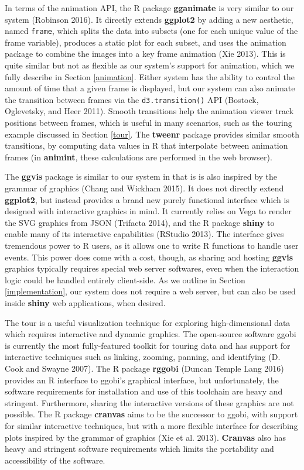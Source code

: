 \documentclass[12pt,]{article}
\theoremstyle{definition}
\theoremstyle{definition}
\theoremstyle{definition}
\theoremstyle{remark}
\begin{document}
In terms of the animation API, the R package \textbf{gganimate} is very
similar to our system (Robinson 2016). It directly extends
\textbf{ggplot2} by adding a new aesthetic, named \texttt{frame}, which
splits the data into subsets (one for each unique value of the frame
variable), produces a static plot for each subset, and uses the
animation package to combine the images into a key frame animation (Xie
2013). This is quite similar but not as flexible as our system's support
for animation, which we fully describe in Section \ref{animation}.
Either system has the ability to control the amount of time that a given
frame is displayed, but our system can also animate the transition
between frames via the \texttt{d3.transition()} API (Bostock,
Oglevetsky, and Heer 2011). Smooth transitions help the animation viewer
track positions between frames, which is useful in many scenarios, such
as the touring example discussed in Section \ref{tour}. The
\textbf{tweenr} package provides similar smooth transitions, by
computing data values in R that interpolate between animation frames (in
\textbf{animint}, these calculations are performed in the web browser).

The \textbf{ggvis} package is similar to our system in that is is also
inspired by the grammar of graphics (Chang and Wickham 2015). It does
not directly extend \textbf{ggplot2}, but instead provides a brand new
purely functional interface which is designed with interactive graphics
in mind. It currently relies on Vega to render the SVG graphics from
JSON (Trifacta 2014), and the R package \textbf{shiny} to enable many of
its interactive capabilities (RStudio 2013). The interface gives
tremendous power to R users, as it allows one to write R functions to
handle user events. This power does come with a cost, though, as sharing
and hosting \textbf{ggvis} graphics typically requires special web
server softwares, even when the interaction logic could be handled
entirely client-side. As we outline in Section \ref{implementation}, our
system does not require a web server, but can also be used inside
\textbf{shiny} web applications, when desired.

The tour is a useful visualization technique for exploring
high-dimensional data which requires interactive and dynamic graphics.
The open-source software ggobi is currently the most fully-featured
toolkit for touring data and has support for interactive techniques such
as linking, zooming, panning, and identifying (D. Cook and Swayne 2007).
The R package \textbf{rggobi} (Duncan Temple Lang 2016) provides an R
interface to ggobi's graphical interface, but unfortunately, the
software requirements for installation and use of this toolchain are
heavy and stringent. Furthermore, sharing the interactive versions of
these graphics are not possible. The R package \textbf{cranvas} aims to
be the successor to ggobi, with support for similar interactive
techniques, but with a more flexible interface for describing plots
inspired by the grammar of graphics (Xie et al. 2013). \textbf{Cranvas}
also has heavy and stringent software requirements which limits the
portability and accessibility of the software.
\end{document}

